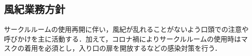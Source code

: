 \subsection*{風紀業務方針}


サークルルームの使用再開に伴い，風紀が乱れることがないよう口頭での注意や呼びかけを主に活動する．加えて，コロナ禍によりサークルルームの使用時はマスクの着用を必須とし，入り口の扉を開放するなどの感染対策を行う．
